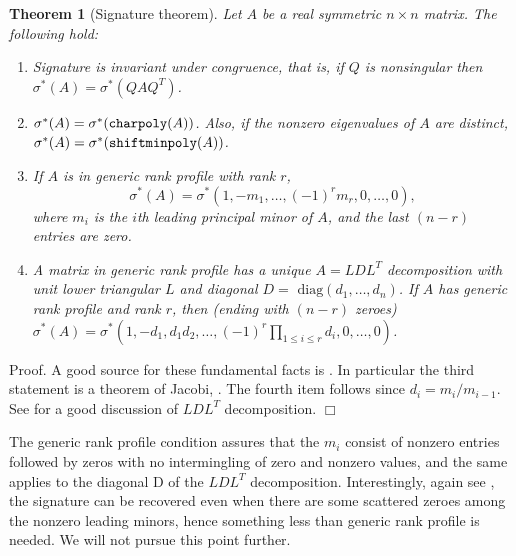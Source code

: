 \documentclass{acm_proc_article-sp}
\newcommand{\diag}{\mbox{ diag}}
\newcommand{\charpoly}[1]{\ensuremath{\mbox{\tt charpoly}(#1)}}
\newcommand{\shiftminpoly}[1]{\ensuremath{\mbox{\tt shiftminpoly}(#1)}}
\newcommand{\QED}{\ensuremath{\Box}}
\newcommand{\signature}{\ensuremath{\sigma^{*}}}
\newtheorem{theorem}{Theorem}
\begin{document}
\begin{theorem} [Signature theorem]{\label{theorem:sig}}
Let $A$ be a real symmetric $n\times n$ matrix.
The following hold:
\begin{enumerate}
\item 
Signature is invariant under congruence, that is, if 
$Q$ is nonsingular then $\signature(A) = \signature(QAQ^T)$.
\item
$\signature(A) = \signature(\charpoly{A})$.
Also, if the nonzero eigenvalues of $A$ are distinct,
$\signature(A) = \signature(\shiftminpoly{A})$.
\item
If $A$ is in generic rank profile with rank $r$, 
$$\signature(A) = \signature(1, -m_1, \ldots, (-1)^r m_r, 0, \ldots, 0),$$
where $m_i$ is the $i$th leading principal minor of $A$, and the last $(n-r)$
entries are zero.
\item
A matrix in generic rank profile has a unique $A = LDL^T$ decomposition with 
unit lower triangular $L$ and diagonal $D = \diag(d_1, \ldots, d_n)$.  If $A$
has generic rank profile and rank $r$, then (ending with $(n-r)$ zeroes)\\
$\signature(A) = 
\signature(1, -d_1, d_1 d_2, \ldots, (-1)^r\prod_{1 \leq i \leq r}d_i, 0, \ldots, 0)$. 
\end{enumerate}
\end{theorem}

Proof.  A good source for these fundamental facts is \cite{gantmacher}.
In particular the third statement is a theorem of Jacobi, \cite[Chapter X, \S 3, theorem 2]{gantmacher}.
The fourth item follows since $d_i = m_i/m_{i-1}$.
See \cite[Chapter 4]{GoLo96} for a good discussion of $LDL^T$ decomposition.
\QED

The generic rank profile condition assures that the $m_i$ consist of nonzero entries followed
by zeros with no intermingling of zero and nonzero values, and the same applies to the 
diagonal D of the $LDL^T$ decomposition.
Interestingly, again see \cite{gantmacher}, the 
signature can be recovered even when there are some scattered zeroes among the nonzero 
leading minors, hence something less than generic rank profile is needed.  
We will not pursue this point further. 
\end{document}
